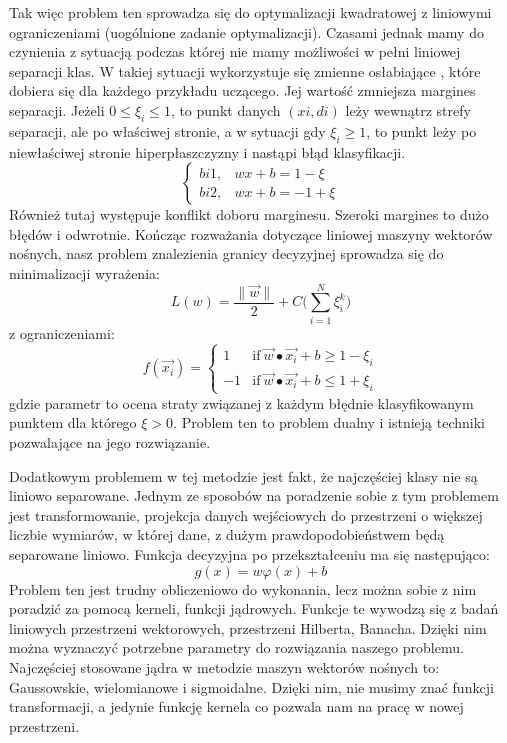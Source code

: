 Tak więc problem ten sprowadza się do optymalizacji kwadratowej z liniowymi ograniczeniami (uogólnione zadanie optymalizacji). 
Czasami jednak mamy do czynienia z sytuacją podczas której nie mamy możliwości w pełni liniowej separacji klas. W takiej sytuacji wykorzystuje się zmienne osłabiające , które dobiera się dla każdego przykładu uczącego. Jej wartość zmniejsza margines separacji. Jeżeli $0 \le \xi_{i} \le 1$, to punkt danych $(xi,di)$ leży wewnątrz strefy separacji, ale po właściwej stronie, a w sytuacji gdy $\xi_{i} \ge 1$, to punkt leży po niewłaściwej stronie hiperpłaszczyzny i nastąpi błąd klasyfikacji. 
\[
    \begin{cases}
            bi1,&  wx+b = 1 - \xi\\
            bi2,& wx+b= -1 + \xi
    \end{cases}
\]
Również tutaj występuje konflikt doboru marginesu. Szeroki margines to dużo błędów i odwrotnie. Kończąc rozważania dotyczące liniowej maszyny wektorów nośnych, nasz problem znalezienia granicy decyzyjnej sprowadza się do minimalizacji wyrażenia:
\[
L(w) = \frac{\|\vec{w}\|}{2} + C\big(\sum_{i=1}^{N}\xi_{i}^{k}\big)
\]
z ograniczeniami:
\[
f(\vec{x_{i}}) = 
    \begin{cases}
            1 &  \text{if}\ \vec{w} \bullet \vec{x_{i}}+b \ge 1 - \xi_{i}\\
            -1 &  \text{if}\ \vec{w} \bullet \vec{x_{i}}+b \le 1 + \xi_{i}
    \end{cases}
\]
gdzie parametr  to ocena straty związanej z każdym błędnie klasyfikowanym punktem dla którego $\xi > 0$. Problem ten to problem dualny i istnieją techniki pozwalające na jego rozwiązanie.

Dodatkowym problemem w tej metodzie jest fakt, że najczęściej klasy nie są liniowo separowane. Jednym ze sposobów na poradzenie sobie z tym problemem jest transformowanie, projekcja danych wejściowych do przestrzeni o większej liczbie wymiarów, w której dane, z dużym prawdopodobieństwem będą separowane liniowo. Funkcja decyzyjna po przekształceniu ma się następująco:
\[
g(x) = w\varphi(x) + b
\]
Problem ten jest trudny obliczeniowo do wykonania, lecz można sobie z nim poradzić za pomocą kerneli, funkcji jądrowych. Funkcje te wywodzą się z badań liniowych przestrzeni wektorowych, przestrzeni Hilberta, Banacha. Dzięki nim można wyznaczyć potrzebne parametry do rozwiązania naszego problemu. Najczęściej stosowane jądra w metodzie maszyn wektorów nośnych to: Gaussowskie, wielomianowe i sigmoidalne. Dzięki nim, nie musimy znać funkcji transformacji, a jedynie funkcję kernela co pozwala nam na pracę w nowej przestrzeni. 

